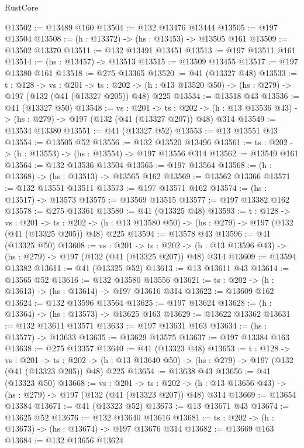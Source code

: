 \begin{lexlean}{RustCore}
\begin{coremodule}
@13502 := @13489 @160
@13504 := @132 @13476 @13444
@13505 := @197 @13504
@13508 := (h : @13372) -> (hs : @13453) -> @13505 @161
@13509 := @13502 @13370
@13511 := @132 @13491 @13451
@13513 := @197 @13511 @161
@13514 := (hs : @13457) -> @13513
@13515 := @13509 @13455
@13517 := @197 @13380 @161
@13518 := @275 @13365
@13520 := @41 (@13327 @48)
@13533 := {t : @128} ->
  {vs : @201} ->
  {ts : @202} -> (h : @13 @13520 @50) -> (hs : @279) -> @197 (@132 (@41 (@13327 @205)) @48) @225
@13534 := @13518 @43
@13536 := @41 (@13327 @50)
@13548 := {vs : @201} ->
  {ts : @202} -> (h : @13 @13536 @43) -> (hs : @279) -> @197 (@132 (@41 (@13327 @207)) @48) @314
@13549 := @13534 @13380
@13551 := @41 (@13327 @52)
@13553 := @13 @13551 @43
@13554 := @13505 @52
@13556 := @132 @13520 @13496
@13561 := {ts : @202} -> (h : @13553) -> (hs : @13554) -> @197 @13556 @314
@13562 := @13549 @161
@13564 := @132 @13536 @13504
@13565 := @197 @13564
@13568 := (h : @13368) -> (hs : @13513) -> @13565 @162
@13569 := @13562 @13366
@13571 := @132 @13551 @13511
@13573 := @197 @13571 @162
@13574 := (hs : @13517) -> @13573
@13575 := @13569 @13515
@13577 := @197 @13382 @162
@13578 := @275 @13361
@13580 := @41 (@13325 @48)
@13593 := {t : @128} ->
  {vs : @201} ->
  {ts : @202} -> (h : @13 @13580 @50) -> (hs : @279) -> @197 (@132 (@41 (@13325 @205)) @48) @225
@13594 := @13578 @43
@13596 := @41 (@13325 @50)
@13608 := {vs : @201} ->
  {ts : @202} -> (h : @13 @13596 @43) -> (hs : @279) -> @197 (@132 (@41 (@13325 @207)) @48) @314
@13609 := @13594 @13382
@13611 := @41 (@13325 @52)
@13613 := @13 @13611 @43
@13614 := @13565 @52
@13616 := @132 @13580 @13556
@13621 := {ts : @202} -> (h : @13613) -> (hs : @13614) -> @197 @13616 @314
@13622 := @13609 @162
@13624 := @132 @13596 @13564
@13625 := @197 @13624
@13628 := (h : @13364) -> (hs : @13573) -> @13625 @163
@13629 := @13622 @13362
@13631 := @132 @13611 @13571
@13633 := @197 @13631 @163
@13634 := (hs : @13577) -> @13633
@13635 := @13629 @13575
@13637 := @197 @13384 @163
@13638 := @275 @13357
@13640 := @41 (@13323 @48)
@13653 := {t : @128} ->
  {vs : @201} ->
  {ts : @202} -> (h : @13 @13640 @50) -> (hs : @279) -> @197 (@132 (@41 (@13323 @205)) @48) @225
@13654 := @13638 @43
@13656 := @41 (@13323 @50)
@13668 := {vs : @201} ->
  {ts : @202} -> (h : @13 @13656 @43) -> (hs : @279) -> @197 (@132 (@41 (@13323 @207)) @48) @314
@13669 := @13654 @13384
@13671 := @41 (@13323 @52)
@13673 := @13 @13671 @43
@13674 := @13625 @52
@13676 := @132 @13640 @13616
@13681 := {ts : @202} -> (h : @13673) -> (hs : @13674) -> @197 @13676 @314
@13682 := @13669 @163
@13684 := @132 @13656 @13624

\end{coremodule}
\end{lexlean}
